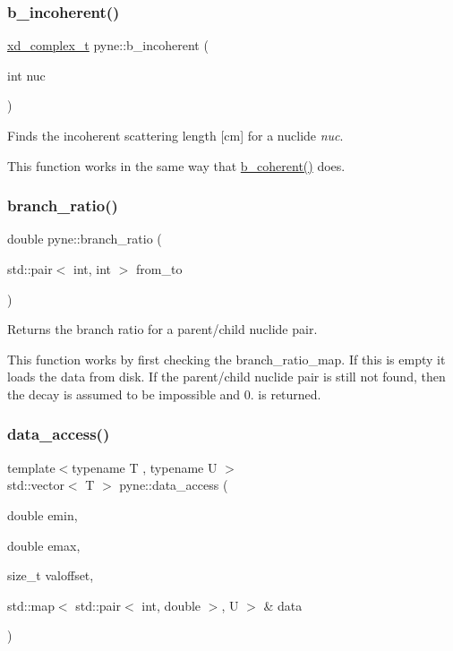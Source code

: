 \subsubsection{\texorpdfstring{b\+\_\+incoherent()}{b\_incoherent()}}
{\footnotesize\ttfamily \hyperlink{structxd__complex__t}{xd\+\_\+complex\+\_\+t} pyne\+::b\+\_\+incoherent (\begin{DoxyParamCaption}\item[{int}]{nuc }\end{DoxyParamCaption})}



Finds the incoherent scattering length \mbox{[}cm\mbox{]} for a nuclide {\itshape nuc}. 

This function works in the same way that \hyperlink{namespacepyne_a94620ef1a92c4562e8d4d54242428ab8}{b\+\_\+coherent()} does. \mbox{\label{namespacepyne_af619eaa83237b583dd7f3b5c6b41a618}} 
\subsubsection{\texorpdfstring{branch\+\_\+ratio()}{branch\_ratio()}}
{\footnotesize\ttfamily double pyne\+::branch\+\_\+ratio (\begin{DoxyParamCaption}\item[{std\+::pair$<$ int, int $>$}]{from\+\_\+to }\end{DoxyParamCaption})}



Returns the branch ratio for a parent/child nuclide pair. 

This function works by first checking the branch\+\_\+ratio\+\_\+map. If this is empty it loads the data from disk. If the parent/child nuclide pair is still not found, then the decay is assumed to be impossible and 0. is returned. \mbox{\label{namespacepyne_aa125de2afb079df43b2db1029792bf44}} 
\subsubsection{\texorpdfstring{data\+\_\+access()}{data\_access()}\hspace{0.1cm}{\footnotesize\ttfamily [1/5]}}
{\footnotesize\ttfamily template$<$typename T , typename U $>$ \\
std\+::vector$<$ T $>$ pyne\+::data\+\_\+access (\begin{DoxyParamCaption}\item[{double}]{emin,  }\item[{double}]{emax,  }\item[{size\+\_\+t}]{valoffset,  }\item[{std\+::map$<$ std\+::pair$<$ int, double $>$, U $>$ \&}]{data }\end{DoxyParamCaption})}

